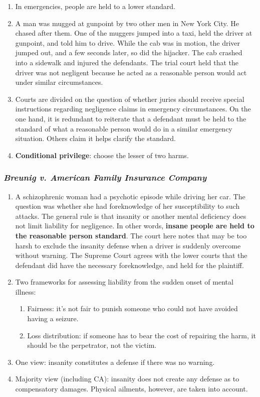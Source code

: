 \begin{enumerate}
    \item In emergencies, people are held to a lower standard.
    \item A man was mugged at gunpoint by two other men in New York City. He 
    chased after them. One of the muggers jumped into a taxi, held the driver 
    at gunpoint, and told him to drive. While the cab was in motion, the 
    driver jumped out, and a few seconds later, so did the hijacker. The cab 
    crashed into a sidewalk and injured the defendants. The trial court held 
    that the driver was not negligent because he acted as a reasonable person 
    would act under similar circumstances.
    \item Courts are divided on the question of whether juries should receive 
    special instructions regarding negligence claims in emergency 
    circumstances. On the one hand, it is redundant to reiterate that a 
    defendant must be held to the standard of what a reasonable person would 
    do in a similar emergency situation. Others claim it helps clarify the 
    standard.
    \item \textbf{Conditional privilege}: choose the lesser of two harms.
\end{enumerate}

\subsubsection{\emph{Breunig v. American Family Insurance Company}}

\begin{enumerate}
    \item A schizophrenic woman had a psychotic episode while driving her car. 
    The question was whether she had foreknowledge of her susceptibility to 
    such attacks. The general rule is that insanity or another mental 
    deficiency does not limit liability for negligence. In other words, 
    \textbf{insane people are held to the reasonable person standard}. The 
    court here notes that may be too harsh to exclude the insanity defense 
    when a driver is suddenly overcome without warning. The Supreme Court 
    agrees with the lower courts that the defendant did have the necessary 
    foreknowledge, and held for the plaintiff.  \item Two frameworks for 
    assessing liability from the sudden onset of mental illness:
    \begin{enumerate}
        \item Fairness: it's not fair to punish someone who could not have 
        avoided having a seizure.
        \item Loss distribution: if someone has to bear the cost of repairing 
        the harm, it should be the perpetrator, not the victim.
    \end{enumerate}
    \item One view: insanity constitutes a defense if there was no warning.
    \item Majority view (including CA): insanity does not create any defense 
    as to compensatory damages. Physical ailments, however, are taken into 
    account.
\end{enumerate}

